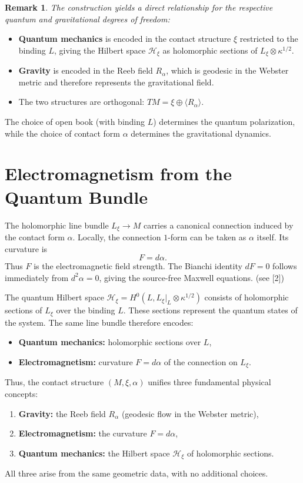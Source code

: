 \documentclass[12pt]{article}
\newtheorem{remark}[theorem]{Remark}
\newcommand{\Hilb}{\mathcal{H}}
\begin{document}
\begin{remark}

The construction yields a direct relationship for the respective quantum and gravitational degrees of freedom:
\end{remark}

\begin{itemize}
\item \textbf{Quantum mechanics} is encoded in the contact structure $\xi$ restricted to the binding $L$, giving the Hilbert space $\Hilb_\xi$ as holomorphic sections of $L_\xi \otimes \kappa^{1/2}$.
\item \textbf{Gravity} is encoded in the Reeb field $R_\alpha$, which is geodesic in the Webster metric and therefore represents the gravitational field.
\item The two structures are orthogonal: $TM = \xi \oplus \langle R_\alpha \rangle$.
\end{itemize}

The choice of open book (with binding $L$) determines the quantum polarization, while the choice of contact form $\alpha$ determines the gravitational dynamics.

\section{Electromagnetism from the Quantum Bundle}

The holomorphic line bundle $L_\xi \to M$ carries a canonical connection induced by the contact form $\alpha$. Locally, the connection $1$-form can be taken as $\alpha$ itself. Its curvature is
\[
F = d\alpha.
\]
Thus $F$ is the electromagnetic field strength. The Bianchi identity $dF = 0$ follows immediately from $d^2\alpha = 0$, giving the source-free Maxwell equations.   (see [2])

The quantum Hilbert space $\Hilb_\xi = H^0(L, L_\xi|_L \otimes \kappa^{1/2})$ consists of holomorphic sections of $L_\xi$ over the binding $L$. These sections represent the quantum states of the system. The same line bundle therefore encodes:
\begin{itemize}
\item \textbf{Quantum mechanics:} holomorphic sections over $L$,
\item \textbf{Electromagnetism:} curvature $F = d\alpha$ of the connection on $L_\xi$.
\end{itemize}

Thus, the contact structure $(M,\xi,\alpha)$ unifies three fundamental physical concepts:
\begin{enumerate}
\item \textbf{Gravity:} the Reeb field $R_\alpha$ (geodesic flow in the Webster metric),
\item \textbf{Electromagnetism:} the curvature $F = d\alpha$,
\item \textbf{Quantum mechanics:} the Hilbert space $\Hilb_\xi$ of holomorphic sections.
\end{enumerate}
All three arise from the same geometric data, with no additional choices.
\end{document}
